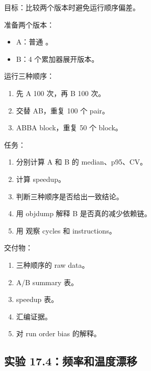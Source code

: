 \begin{labbox}
目标：比较两个版本时避免运行顺序偏差。

准备两个版本：

\begin{itemize}
  \item A：普通 。
  \item B：4 个累加器展开版本。
\end{itemize}

运行三种顺序：

\begin{enumerate}
  \item 先 A 100 次，再 B 100 次。
  \item 交替 AB，重复 100 个 pair。
  \item ABBA block，重复 50 个 block。
\end{enumerate}

任务：

\begin{enumerate}
  \item 分别计算 A 和 B 的 median、p95、CV。
  \item 计算 speedup。
  \item 判断三种顺序是否给出一致结论。
  \item 用 objdump 解释 B 是否真的减少依赖链。
  \item 用  观察 cycles 和 instructions。
\end{enumerate}

交付物：

\begin{enumerate}
  \item 三种顺序的 raw data。
  \item A/B summary 表。
  \item speedup 表。
  \item 汇编证据。
  \item 对 run order bias 的解释。
\end{enumerate}
\end{labbox}

\subsection{实验 17.4：频率和温度漂移}

